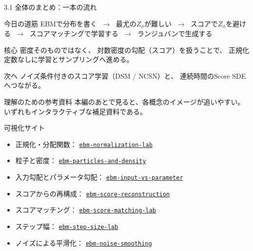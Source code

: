 \asmain
\begin{frame}{3.1 全体のまとめ：一本の流れ}
    \begin{block}{今日の道筋}
        EBMで分布を書く
        $\;\to\;$
        最尤の$Z_\phi$が難しい
        $\;\to\;$
        スコアで$Z_\phi$を避ける
        $\;\to\;$
        スコアマッチングで学習する
        $\;\to\;$
        ランジュバンで生成する
    \end{block}
    \begin{block}{核心}
        密度そのものではなく、
        対数密度の勾配（スコア）を扱うことで、
        正規化定数なしに学習とサンプリングへ進める。
    \end{block}
    \begin{block}{次へ}
        ノイズ条件付きのスコア学習（DSM / NCSN）と、
        連続時間のScore SDEへつながる。
    \end{block}
\end{frame}
\assuppl
\begin{frame}{理解のための参考資料}
    本編のあとで見ると、各概念のイメージが追いやすい。
    いずれもインタラクティブな補足資料である。
    \begin{exampleblock}{可視化サイト}
        \footnotesize
        \begin{itemize}
            \item 正規化・分配関数：
            \href{https://ebm-normalization-lab.intactspoon4.chatgpt.site/}
            {\texttt{ebm-normalization-lab}}
            \item 粒子と密度：
            \href{https://ebm-particles-and-density.intactspoon4.chatgpt.site/}
            {\texttt{ebm-particles-and-density}}
            \item 入力勾配とパラメータ勾配：
            \href{https://ebm-input-vs-parameter.intactspoon4.chatgpt.site/}
            {\texttt{ebm-input-vs-parameter}}
            \item スコアからの再構成：
            \href{https://ebm-score-reconstruction.intactspoon4.chatgpt.site/}
            {\texttt{ebm-score-reconstruction}}
            \item スコアマッチング：
            \href{https://ebm-score-matching-lab.intactspoon4.chatgpt.site/}
            {\texttt{ebm-score-matching-lab}}
            \item ステップ幅：
            \href{https://ebm-step-size-lab.intactspoon4.chatgpt.site/}
            {\texttt{ebm-step-size-lab}}
            \item ノイズによる平滑化：
            \href{https://ebm-noise-smoothing.intactspoon4.chatgpt.site/}
            {\texttt{ebm-noise-smoothing}}
        \end{itemize}
    \end{exampleblock}
\end{frame}
